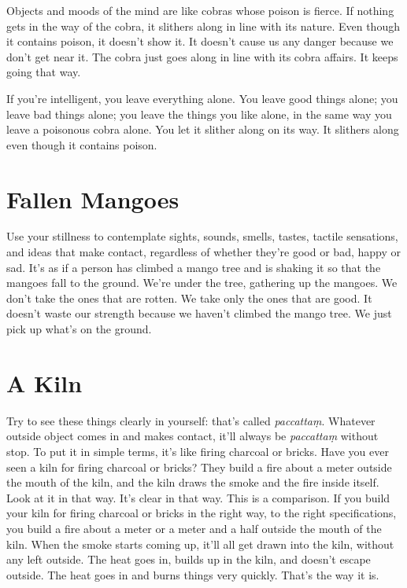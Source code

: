 Objects and moods of the mind are like cobras whose poison is fierce. If nothing gets in the way of the cobra, it slithers along in line with its nature. Even though it contains poison, it doesn't show it. It doesn't cause us any danger because we don't get near it. The cobra just goes along in line with its cobra affairs. It keeps going that way.

If you're intelligent, you leave everything alone. You leave good things alone; you leave bad things alone; you leave the things you like alone, in the same way you leave a poisonous cobra alone. You let it slither along on its way. It slithers along even though it contains poison.

\section{Fallen Mangoes}

Use your stillness to contemplate sights, sounds, smells, tastes, tactile sensations, and ideas that make contact, regardless of whether they're good or bad, happy or sad. It's as if a person has climbed a mango tree and is shaking it so that the mangoes fall to the ground. We're under the tree, gathering up the mangoes. We don't take the ones that are rotten. We take only the ones that are good. It doesn't waste our strength because we haven't climbed the mango tree. We just pick up what's on the ground.

\clearpage

\section{A Kiln}

Try to see these things clearly in yourself: that's called \textit{paccatta\d{m}}. Whatever outside object comes in and makes contact, it'll always be \textit{paccatta\d{m}} without stop. To put it in simple terms, it's like firing charcoal or bricks. Have you ever seen a kiln for firing charcoal or bricks? They build a fire about a meter outside the mouth of the kiln, and the kiln draws the smoke and the fire inside itself. Look at it in that way. It's clear in that way. This is a comparison. If you build your kiln for firing charcoal or bricks in the right way, to the right specifications, you build a fire about a meter or a meter and a half outside the mouth of the kiln. When the smoke starts coming up, it'll all get drawn into the kiln, without any left outside. The heat goes in, builds up in the kiln, and doesn't escape outside. The heat goes in and burns things very quickly. That's the way it is. 

